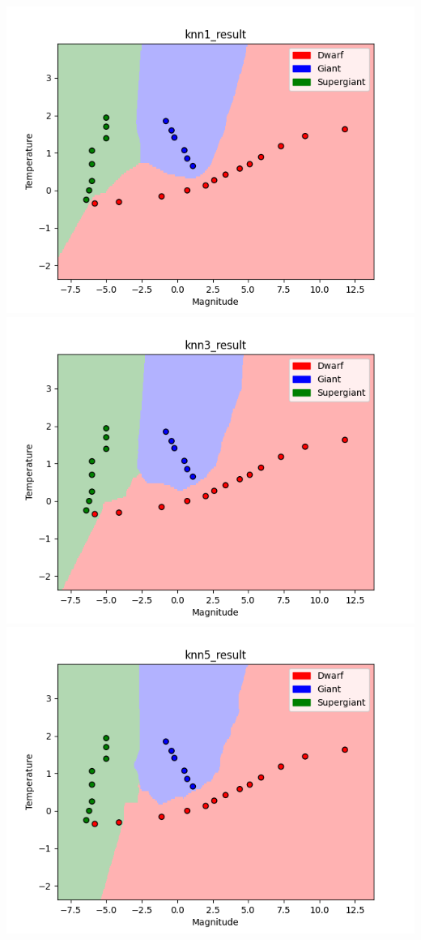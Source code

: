 \documentclass[submit]{harvardml}
\begin{document}
\begin{center}
\includegraphics[scale = 0.75]{knn1_result.png} \\
\includegraphics[scale = 0.75]{knn3_result.png} \\
\includegraphics[scale = 0.75]{knn5_result.png} \\
\end{center}
\end{document}
